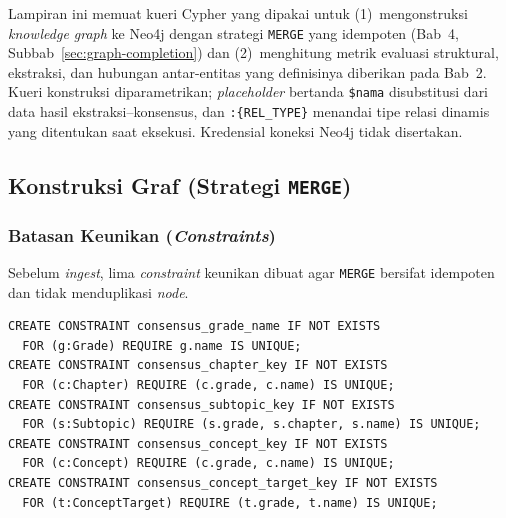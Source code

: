 \documentclass[../../thesis]{subfiles}
\begin{document}
\ifSubfilesClassLoaded{}{\appendix\setcounter{chapter}{5}}

\label{lamp:cypher}

Lampiran ini memuat kueri Cypher yang dipakai untuk (1)~mengonstruksi
\textit{knowledge graph} ke Neo4j dengan strategi \texttt{MERGE} yang idempoten
(Bab~4, Subbab~\ref{sec:graph-completion}) dan (2)~menghitung metrik evaluasi
struktural, ekstraksi, dan hubungan antar-entitas yang definisinya diberikan
pada Bab~2. Kueri konstruksi diparametrikan; \textit{placeholder} bertanda
\texttt{\$nama} disubstitusi dari data hasil ekstraksi--konsensus, dan
\texttt{:\{REL\_TYPE\}} menandai tipe relasi dinamis yang ditentukan saat
eksekusi. Kredensial koneksi Neo4j tidak disertakan.

\subsection{Konstruksi Graf (Strategi \texttt{MERGE})}
\label{lamp:cypher-konstruksi}

\subsubsection{Batasan Keunikan (\textit{Constraints})}

Sebelum \textit{ingest}, lima \textit{constraint} keunikan dibuat agar
\texttt{MERGE} bersifat idempoten dan tidak menduplikasi \textit{node}.

\begin{lstlisting}[style=cypherbox,caption={Constraint keunikan node.},label={lst:cypher-constraint}]
CREATE CONSTRAINT consensus_grade_name IF NOT EXISTS
  FOR (g:Grade) REQUIRE g.name IS UNIQUE;
CREATE CONSTRAINT consensus_chapter_key IF NOT EXISTS
  FOR (c:Chapter) REQUIRE (c.grade, c.name) IS UNIQUE;
CREATE CONSTRAINT consensus_subtopic_key IF NOT EXISTS
  FOR (s:Subtopic) REQUIRE (s.grade, s.chapter, s.name) IS UNIQUE;
CREATE CONSTRAINT consensus_concept_key IF NOT EXISTS
  FOR (c:Concept) REQUIRE (c.grade, c.name) IS UNIQUE;
CREATE CONSTRAINT consensus_concept_target_key IF NOT EXISTS
  FOR (t:ConceptTarget) REQUIRE (t.grade, t.name) IS UNIQUE;
\end{lstlisting}
\end{document}
